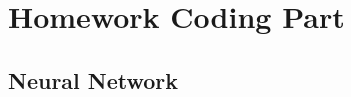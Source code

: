\documentclass[12pt]{article}
\begin{document}

\setcounter{section}{5}
\section{Homework Coding Part}
\subsection{Neural Network}
\end{document}
